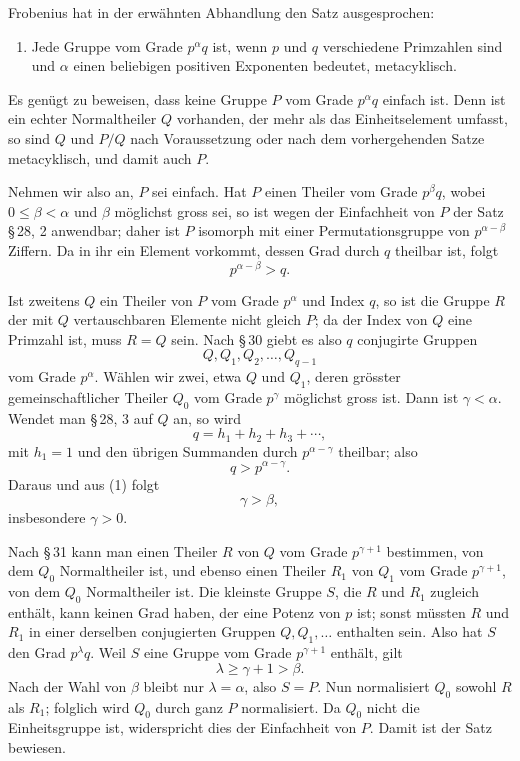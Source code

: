 \documentclass[11pt]{article}
\begin{document}
Frobenius hat in der erwähnten Abhandlung den Satz ausgesprochen:
\begin{enumerate}[label=\Roman*.,leftmargin=2.4em,start=6]
\item Jede Gruppe vom Grade $p^\alpha q$ ist, wenn $p$ und $q$ verschiedene Primzahlen sind und $\alpha$ einen beliebigen positiven Exponenten bedeutet, metacyklisch.
\end{enumerate}
Es genügt zu beweisen, dass keine Gruppe $P$ vom Grade $p^\alpha q$ einfach ist. Denn ist ein echter Normaltheiler $Q$ vorhanden, der mehr als das Einheitselement umfasst, so sind $Q$ und $P/Q$ nach Voraussetzung oder nach dem vorhergehenden Satze metacyklisch, und damit auch $P$.

Nehmen wir also an, $P$ sei einfach. Hat $P$ einen Theiler vom Grade $p^\beta q$, wobei $0\le\beta<\alpha$ und $\beta$ möglichst gross sei, so ist wegen der Einfachheit von $P$ der Satz \S\,28, 2 anwendbar; daher ist $P$ isomorph mit einer Permutationsgruppe von $p^{\alpha-\beta}$ Ziffern. Da in ihr ein Element vorkommt, dessen Grad durch $q$ theilbar ist, folgt
\begin{equation}
p^{\alpha-\beta}>q.
\tag{1}
\end{equation}

Ist zweitens $Q$ ein Theiler von $P$ vom Grade $p^\alpha$ und Index $q$, so ist die Gruppe $R$ der mit $Q$ vertauschbaren Elemente nicht gleich $P$; da der Index von $Q$ eine Primzahl ist, muss $R=Q$ sein. Nach \S\,30 giebt es also $q$ conjugirte Gruppen
\[
Q,Q_1,Q_2,
\ldots,Q_{q-1}
\]
vom Grade $p^\alpha$. Wählen wir zwei, etwa $Q$ und $Q_1$, deren grösster gemeinschaftlicher Theiler $Q_0$ vom Grade $p^\gamma$ möglichst gross ist. Dann ist $\gamma<\alpha$. Wendet man \S\,28, 3 auf $Q$ an, so wird
\[
q=h_1+h_2+h_3+
\cdots,
\]
mit $h_1=1$ und den übrigen Summanden durch $p^{\alpha-\gamma}$ theilbar; also
\begin{equation}
q>p^{\alpha-\gamma}.
\tag{2}
\end{equation}
Daraus und aus (1) folgt
\begin{equation}
\gamma>\beta,
\tag{3}
\end{equation}
insbesondere $\gamma>0$.

Nach \S\,31 kann man einen Theiler $R$ von $Q$ vom Grade $p^{\gamma+1}$ bestimmen, von dem $Q_0$ Normaltheiler ist, und ebenso einen Theiler $R_1$ von $Q_1$ vom Grade $p^{\gamma+1}$, von dem $Q_0$ Normaltheiler ist. Die kleinste Gruppe $S$, die $R$ und $R_1$ zugleich enthält, kann keinen Grad haben, der eine Potenz von $p$ ist; sonst müssten $R$ und $R_1$ in einer derselben conjugierten Gruppen $Q,Q_1,
\ldots$ enthalten sein. Also hat $S$ den Grad $p^\lambda q$. Weil $S$ eine Gruppe vom Grade $p^{\gamma+1}$ enthält, gilt
\[
\lambda\ge \gamma+1>\beta.
\]
Nach der Wahl von $\beta$ bleibt nur $\lambda=\alpha$, also $S=P$. Nun normalisiert $Q_0$ sowohl $R$ als $R_1$; folglich wird $Q_0$ durch ganz $P$ normalisiert. Da $Q_0$ nicht die Einheitsgruppe ist, widerspricht dies der Einfachheit von $P$. Damit ist der Satz bewiesen.
\end{document}
